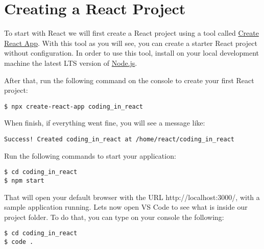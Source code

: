 \documentclass[a4paper, oneside, titlepage, 12pt]{book}
\begin{document}

\section{Creating a React Project} \label{create_react_project}

To start with React we will first create a React project using a tool called \href{https://github.com/facebook/create-react-app}{Create React App}. With this tool as you will see, you can create a starter React project without configuration. In order to use this tool, install on your local development machine the latest LTS version of \href{https://nodejs.org/}{Node.js}.

After that, run the following command on the console to create your first React project:

\begin{verbatim}
$ npx create-react-app coding_in_react
\end{verbatim}

When finish, if everything went fine, you will see a message like:

\begin{verbatim}
Success! Created coding_in_react at /home/react/coding_in_react
\end{verbatim}

Run the following commands to start your application:

\begin{verbatim}
$ cd coding_in_react
$ npm start
\end{verbatim}

That will open your default browser with the URL http://localhost:3000/, with a sample application running. Lets now open VS Code to see what is inside our project folder. To do that, you can type on your console the following: 

\begin{verbatim}
$ cd coding_in_react
$ code .
\end{verbatim}
\end{document}
